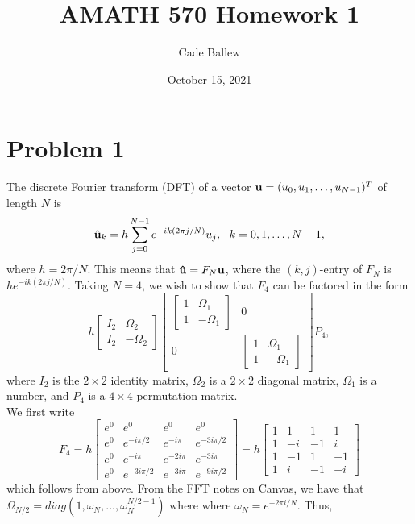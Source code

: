 \documentclass{article}
\title{AMATH 570 Homework 1}
\author{Cade Ballew}
\date{October 15, 2021}
\begin{document}
\maketitle

\section{Problem 1}
The discrete Fourier transform (DFT) of a vector ${\bf u} = ( u_0 , u_1 , 
\ldots , u_{N-1} )^T$ of length $N$ is
\[
\hat{{\bf u}}_k = h \sum_{j=0}^{N-1} e^{-i k (2 \pi j/N)} u_j ,
~~k=0,1, \ldots , N-1,
\]
where $h = 2 \pi / N$.  This means that ${\bf \hat{u}} = F_N {\bf u}$,
where the $(k,j)$-entry of $F_N$ is $h e^{-ik (2 \pi j/N)}$.   Taking $N=4$, we wish to show that $F_4$ can be factored in the form
\[
h \left[ \begin{array}{cc} I_2 & \Omega_2 \\ I_2 & - \Omega_2 \end{array}
\right]
\left[ \begin{array}{cc}
\left[ \begin{array}{cc} 1 & \Omega_1 \\ 1 & - \Omega_1 \end{array} \right] & 0 \\
0 & \left[ \begin{array}{cc} 1 & \Omega_1 \\ 1 & - \Omega_1 \end{array} \right]
\end{array} \right] P_4 ,
\]
where $I_2$ is the $2 \times 2$ identity matrix, $\Omega_2$ is a $2 \times 2$
diagonal matrix, $\Omega_1$ is a number, and $P_4$ is a $4 \times 4$
permutation matrix.\\
We first write 
\[
F_4= h \left[ \begin{array}{cccc} e^0 & e^0 & e^0 & e^0 \\ 
e^0 & e^{-i\pi/2}&e^{-i\pi}&e^{-3i\pi/2}\\ 
e^0 & e^{-i\pi}&e^{-2i\pi}&e^{-3i\pi}\\
e^0&e^{-3i\pi/2}&e^{-3i\pi}&e^{-9i\pi/2}\end{array}
\right]
=h\left[ \begin{array}{cccc}1&1&1&1\\
1&-i&-1&i\\
1&-1&1&-1\\
1&i&-1&-i\end{array}
\right]
\]
which follows from above. From the FFT notes on Canvas, we have that $\Omega_{N/2}=diag(1,\omega_N,...,\omega_N^{N/2-1})$ where where $\omega_N=e^{-2\pi i/N}$. Thus,
\end{document}
